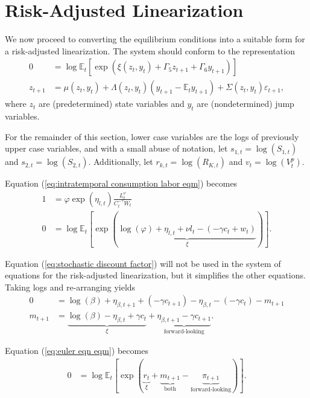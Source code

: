 \documentclass[12 pt, oneside]{article}
\theoremstyle{definition}
\theoremstyle{definition}
\theoremstyle{definition}
\newcommand{\E}{\mathbb{E}}
\newcommand{\fd}{\vspace{2.5mm}}
\begin{document}
\section{Risk-Adjusted Linearization}\label{sec:ral}

We now proceed to converting the equilibrium conditions into a suitable form for a risk-adjusted linearization. The system should conform to the representation
\begin{align*}
  0 & = \log \E_t\left[\exp\left(\xi(z_t, y_t) + \Gamma_5 z_{t + 1} + \Gamma_6 y_{t + 1}\right)\right]\\
  z_{t + 1} & = \mu(z_t, y_t) + \Lambda(z_t, y_t) (y_{t + 1} - \E_t y_{t + 1}) + \Sigma(z_t, y_t) \varepsilon_{t + 1},
\end{align*}
where $z_t$ are (predetermined) state variables and $y_t$ are (nondetermined) jump variables.

For the remainder of this section, lower case variables are the logs of previously upper case variables, and with a small abuse of notation, let $s_{1, t} = \log(S_{1, t})$ and $s_{2, t} = \log(S_{2, t})$. Additionally, let $r_{k, t} = \log(R_{K, t})$ and $v_t = \log(V_t^p)$.

\fd

Equation (\ref{eq:intratemporal consumption labor eqm}) becomes
\begin{align*}
  1 & = \varphi \exp(\eta_{l, t})\frac{L_t^\nu}{C_t^{-\gamma}W_t}\\
  0 & = \log \E_t\left[\exp\left(\underbrace{\log(\varphi) + \eta_{l, t} + \nu l_t - (- \gamma c_t + w_t)}_{\xi}\right)\right].
\end{align*}

Equation (\ref{eq:stochastic discount factor}) will not be used in the system of equations for the risk-adjusted linearization,
but it simplifies the other equations. Taking logs and re-arranging yields
\begin{align*}
  0 & =  \log(\beta) + \eta_{\beta, t + 1} + (-\gamma c_{t + 1}) - \eta_{\beta, t} - (-\gamma c_t) - m_{t + 1}\\
  m_{t + 1}  & = \underbrace{\log(\beta) -\eta_{\beta, t} + \gamma c_t}_{\xi} + \underbrace{\eta_{\beta, t + 1} - \gamma c_{t + 1}}_{\text{forward-looking}}.
\end{align*}

Equation (\ref{eq:euler eqn eqm}) becomes
\begin{align*}
  0 & = \log\E_t\left[\exp\left(\underbrace{r_t}_{\xi} + \underbrace{m_{t + 1}}_{\text{both}} - \underbrace{\pi_{t + 1}}_{\text{forward-looking}}  \right)\right].
\end{align*}
\end{document}
